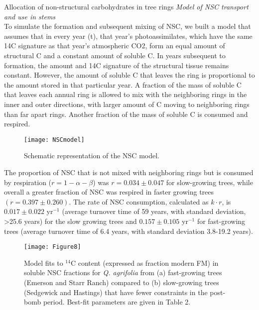\documentclass[final,hyperref={pdfpagelabels=false}, professionalmath, mathserif, 11pt]{beamer}
\begin{document}
\begin{frame}
\begin{columns}
\begin{column}{.48\textwidth}
\begin{minipage}[T]{.95\textwidth}
      \begin{block}{Allocation of non-structural carbohydrates in tree rings}
      {\it Model of NSC transport and use in stems} \\
\small To simulate the formation and subsequent mixing of NSC, we built a model that assumes that in every year (t), that year’s photoassimilates, which have the same 14C signature as that year’s atmospheric CO2, form an equal amount of structural C and a constant amount of soluble C. In years subsequent to formation, the amount and 14C signature of the structural tissue remains constant. 
However, the amount of soluble C that leaves the ring is proportional to the amount stored in that particular year. A fraction of the mass of soluble C that leaves each annual ring is allowed to mix with the neighboring rings in the inner and outer directions, with larger amount of C moving to neighboring rings than far apart rings. Another fraction of the mass of soluble C is consumed and respired.
	\begin{figure}
	 \texttt{[image: NSCmodel]}
	  \caption{Schematic representation of the NSC model.}
	\end{figure}
      \end{block}
      \begin{block}{}
      \small
The proportion of NSC that is not mixed with neighboring rings but is consumed by respiration ($r=1-\alpha - \beta$) was $r=0.034 \pm 0.047$ for slow-growing trees, while overall a greater fraction of NSC was respired in faster growing trees $(r=0.397 \pm 0.260)$. The rate of NSC consumption, calculated as $k \cdot r$, is  $0.017 \pm 0.022$ yr$^{-1}$ (average turnover time of 59 years, with standard deviation, >25.6 years) for the slow growing trees and $0.157  \pm 0.105$ yr$^{-1}$ for fast-growing trees (average turnover time of 6.4 years, with standard deviation 3.8-19.2 years).

	\begin{figure}
	  \texttt{[image: Figure8]}
	  \caption{Model fits to $^{14}$C content (expressed as fraction modern FM) in soluble NSC fractions for {\it Q. agrifolia} from (a) fast-growing trees (Emerson and Starr Ranch) compared to (b) slow-growing trees (Sedgewick and Hastings) that have fewer constraints in the post-bomb period.  Best-fit parameters are given in Table 2.}
	\end{figure}
      \end{block}
    \end{minipage}
  \end{column}
  

\end{columns}
\end{frame}
\end{document}
